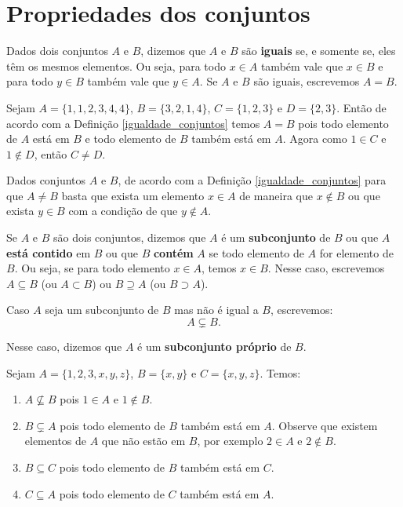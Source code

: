 \section{Propriedades dos conjuntos}

\begin{definicao}\label{igualdade_conjuntos}
    Dados dois conjuntos $A$ e $B$, dizemos que $A$ e $B$ são \textbf{iguais} se, e somente se, eles têm os mesmos elementos. Ou seja, para todo $x \in A$ também vale que $x \in B$ e para todo $y \in B$ também vale que $y \in A$. Se $A$ e $B$ são iguais, escrevemos $A = B$.
\end{definicao}

\begin{exemplo}
    Sejam $A = \{1,1,2,3,4,4\}$, $B = \{3,2,1,4\}$, $C = \{1,2,3\}$ e $D = \{2,3\}$. Então de acordo com a Definição
    \ref{igualdade_conjuntos} temos $A = B$ pois todo elemento de $A$ está em $B$ e todo elemento de $B$ também está em $A$. Agora
    como $1 \in C$ e $1 \notin D$, então $C \ne D$.
\end{exemplo}

\begin{observacao}
    Dados conjuntos $A$ e $B$, de acordo com a Definição \ref{igualdade_conjuntos} para que $A \ne B$ basta que exista um elemento $x \in A$ de maneira que $x \notin B$ ou que exista $y \in B$ com a condição de que $y \notin A$.
\end{observacao}

\begin{definicao}\label{definicao_continencia_conjuntos}
    Se $A$ e $B$ são dois conjuntos, dizemos que $A$ é um \textbf{subconjunto} de $B$ ou que $A$ \textbf{está contido} em $B$ ou que $B$ \textbf{contém} $A$ se todo elemento de $A$ for elemento de $B$. Ou seja, se para todo elemento $x \in A$, temos $x \in B$. Nesse caso, escrevemos $A \subseteq B$ (ou $A \subset B$) ou $B \supseteq A$ (ou $B \supset A$).
\end{definicao}


Caso $A$ seja um subconjunto de $B$ mas não é igual a $B$, escrevemos:
\[
    A \subsetneq B.
\]

Nesse caso, dizemos que $A$ é um \textbf{subconjunto pr{ó}prio} de $B$.

\begin{exemplos}
    Sejam $A = \{1,2,3,x,y,z\}$, $B = \{x, y\}$ e $C = \{x, y , z\}$. Temos:
    \begin{enumerate}[label={\arabic*})]
        \item $A \nsubseteq B$ pois $1 \in A$ e $1 \notin B$.
        \item $B \subsetneq A$ pois todo elemento de $B$ também está em $A$. Observe que existem elementos de $A$ que não estão em $B$, por exemplo $2 \in A$ e $2 \notin B$.
        \item $B \subseteq C$ pois todo elemento de $B$ também está em $C$.
        \item $C \subseteq A$ pois todo elemento de $C$ também está em $A$.
    \end{enumerate}
\end{exemplos}

